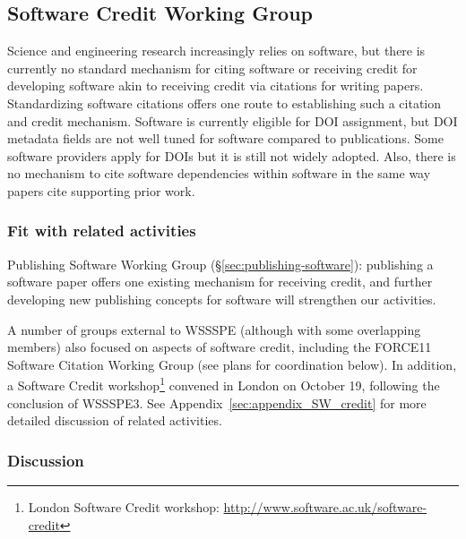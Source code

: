 \subsection{Software Credit Working Group}
\label{sec:software-credit}


Science and engineering research increasingly relies on software, but there is
currently no standard mechanism for citing software or receiving credit for
developing software akin to receiving credit via citations for writing papers.
Standardizing software citations offers one route to establishing such a
citation and credit mechanism. Software is currently eligible for DOI
assignment, but DOI metadata fields are not well tuned for software compared to
publications. Some software providers apply for DOIs but it is still not widely
adopted. Also, there is no mechanism to cite software dependencies within
software in the same way papers cite supporting prior work.

\subsubsection{Fit with related activities}

Publishing Software Working Group (\S\ref{sec:publishing-software}): publishing
a software paper offers one existing mechanism for receiving credit, and further
developing new publishing concepts for software will strengthen our activities.

A number of groups external to WSSSPE (although with some overlapping members)
also focused on aspects of software credit, including the FORCE11 Software
Citation Working Group (see plans for coordination below). In addition, a
Software Credit workshop\footnote{London Software Credit workshop:
\url{http://www.software.ac.uk/software-credit}} convened in London on October
19, following the conclusion of WSSSPE3. See
Appendix~\ref{sec:appendix_SW_credit} for more detailed discussion of related
activities.

\subsubsection{Discussion}

